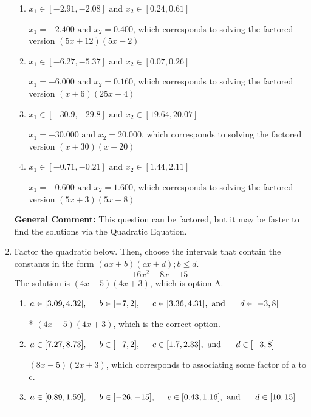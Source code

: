 \documentclass{extbook}[14pt]
\newcommand{\litem}[1]{\item #1

\rule{\textwidth}{0.4pt}}
\begin{document}
\begin{enumerate}
{\begin{enumerate}[label=\Alph*.]
* $x_1 = -1.200 \text{ and } x_2 = 0.800$, which is the correct option. Obtained by solving the factored version $(5x + 6)(5x -4)$
\item \( x_1 \in [-2.91, -2.08] \text{ and } x_2 \in [0.24, 0.61] \)

$x_1 = -2.400 \text{ and } x_2 = 0.400$, which corresponds to solving the factored version $(5x + 12)(5x -2)$
\item \( x_1 \in [-6.27, -5.37] \text{ and } x_2 \in [0.07, 0.26] \)

$x_1 = -6.000 \text{ and } x_2 = 0.160$, which corresponds to solving the factored version $(x + 6)(25x -4)$
\item \( x_1 \in [-30.9, -29.8] \text{ and } x_2 \in [19.64, 20.07] \)

$x_1 = -30.000 \text{ and } x_2 = 20.000$, which corresponds to solving the factored version $(x + 30)(x -20)$
\item \( x_1 \in [-0.71, -0.21] \text{ and } x_2 \in [1.44, 2.11] \)

$x_1 = -0.600 \text{ and } x_2 = 1.600$, which corresponds to solving the factored version $(5x + 3)(5x -8)$
\end{enumerate}

\textbf{General Comment:} This question can be factored, but it may be faster to find the solutions via the Quadratic Equation.
}
\litem{
Factor the quadratic below. Then, choose the intervals that contain the constants in the form $(ax+b)(cx+d); b \leq d.$
\[ 16x^{2} -8 x -15 \]The solution is \( (4x -5)(4x + 3) \), which is option A.\begin{enumerate}[label=\Alph*.]
\item \( a \in [3.09, 4.32], \hspace*{5mm} b \in [-7, 2], \hspace*{5mm} c \in [3.36, 4.31], \text{ and } \hspace*{5mm} d \in [-3, 8] \)

* $(4x -5)(4x + 3)$, which is the correct option.
\item \( a \in [7.27, 8.73], \hspace*{5mm} b \in [-7, 2], \hspace*{5mm} c \in [1.7, 2.33], \text{ and } \hspace*{5mm} d \in [-3, 8] \)

 $(8x -5)(2x + 3)$, which corresponds to associating some factor of a to c.
\item \( a \in [0.89, 1.59], \hspace*{5mm} b \in [-26, -15], \hspace*{5mm} c \in [0.43, 1.16], \text{ and } \hspace*{5mm} d \in [10, 15] \)


\end{enumerate}}
\end{enumerate}
\end{document}
